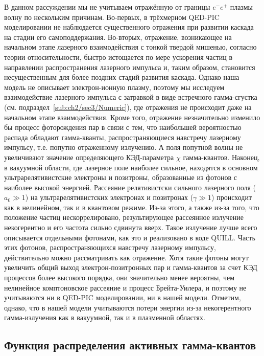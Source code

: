 В данном рассуждении мы не учитываем отражённую от границы $e^-e^+$ плазмы волну по нескольким причинам.
Во-первых, в трёхмерном QED-PIC моделировании не наблюдается существенного отражения при развитии каскада на стадии его самоподдержания.
Во-вторых, отражение, возникающее на начальном этапе лазерного взаимодействия с тонкой твердой мишенью, согласно теории относительности, быстро истощается по мере ускорения частиц в направлении распространения лазерного импульса и, таким образом, становится несущественным для более поздних стадий развития каскада.
Однако наша модель не описывает электрон-ионную плазму, поэтому мы исследуем взаимодействие лазерного импульса с затравкой в виде встречного гамма-сгустка (см. подраздел~\ref{sub:ch2/sec3/Numeric}), где отражения не происходит даже на начальном этапе взаимодействия.
Кроме того, отражение незначительно изменило бы процесс фоторождения пар в связи с тем, что наибольшей вероятностью распада обладают гамма-кванты, распространяющиеся навстречу лазерному импульсу, т.е. попутно отраженному излучению.
А поля попутной волны не увеличивают значение определяющего КЭД-параметра $\chi$ гамма-квантов.
Наконец, в вакуумной области, где лазерное поле наиболее сильное, находятся в основном ультрарелятивистские электроны и позитроны, образованные из фотонов с наиболее высокой энергией.
Рассеяние релятивистски сильного лазерного поля ($a_0 \gg 1$) на ультрарелятивистских электронах и позитронах ($\gamma \gg 1$) происходит как в нелинейном, так и в квантовом режиме.
Из-за этого, а также из-за того, что положение частиц нескоррелировано, результирующее рассеянное излучение некогерентно и его частота сильно сдвинута вверх.
Такое излучение лучше всего описывается отдельными фотонами, как это и реализовано в коде QUILL.
Часть этих фотонов, распространяющихся навстречу лазерному импульсу, действительно можно рассматривать как отражение.
Хотя такие фотоны могут увеличить общий выход электрон-позитронных пар и гамма-квантов за счет КЭД процессов более высокого порядка, они значительно менее вероятны, чем нелинейное комптоновское рассеяние и процесс Брейта-Уилера, и поэтому не учитываются ни в QED-PIC моделировании, ни в нашей модели.
Отметим, однако, что в нашей модели учитываются потери энергии из-за некогерентного гамма-излучения как в вакуумной, так и в плазменной областях.

\subsection{Функция распределения активных гамма-квантов}
\label{sub:ch2/sec3/gammas}


